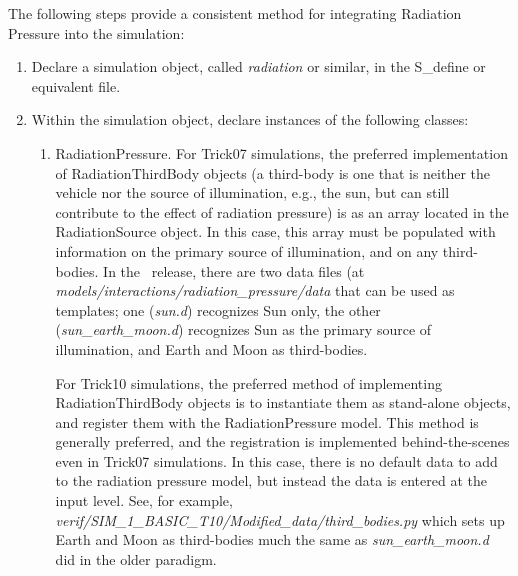 The following steps provide a consistent method for integrating Radiation
Pressure into the simulation:
\begin{enumerate}
  \item{} Declare a simulation object, called \textit{radiation} or similar, in
  the
         S\_define or equivalent file.
  \item{} Within the simulation object, declare instances of the following
  classes:
  \begin{enumerate}
    \item{RadiationPressure}. \newline
      For Trick07 simulations, the preferred implementation
      of RadiationThirdBody
      objects (a third-body is one that is
      neither the vehicle nor the source of illumination, e.g., the sun,
      but can still contribute to the effect of radiation pressure)
      is as an array located in the RadiationSource object.  In this case,
      this array must be populated with information
      on the primary source of illumination, and on any third-bodies.
      In the \JEODid\ release, there are two data files (at
      \textit{models/interactions/radiation\_pressure/data} that can be used as
      templates; one (\textit{sun.d}) recognizes Sun only,
      the other (\textit{sun\_earth\_moon.d}) recognizes Sun as the primary
      source of illumination, and Earth and Moon as third-bodies.

      For Trick10 simulations, the preferred method of implementing
      RadiationThirdBody objects is to instantiate them as stand-alone objects,
      and register them with the RadiationPressure model.  This method is
      generally preferred, and the registration is implemented
      behind-the-scenes even in Trick07 simulations.  In this case, there is no
      default data to add to the radiation pressure model, but instead the data
      is entered at the input level.  See, for example,
      \textit{verif/SIM\_1\_BASIC\_T10/Modified\_data/third\_bodies.py} which
      sets up Earth and Moon as third-bodies much the same as
      \textit{sun\_earth\_moon.d} did in the older paradigm.


\end{enumerate}
\end{enumerate}
